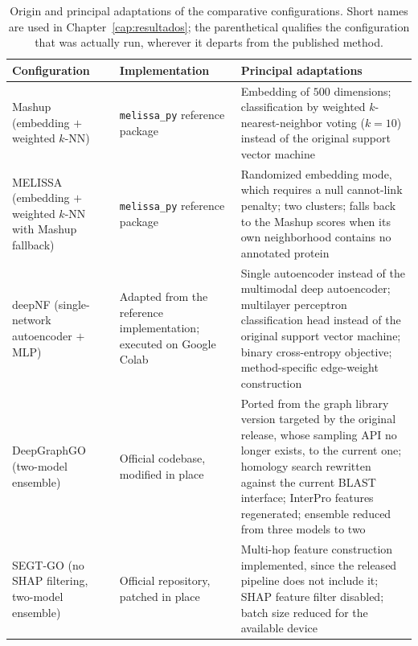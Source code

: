 \documentclass[Ingles]{ic-tese-v3}
\begin{document}
\begin{appendices}{}
\begin{table}[!htb]
  \centering
  \small
  \caption{Origin and principal adaptations of the comparative configurations. Short names are used
  in Chapter~\ref{cap:resultados}; the parenthetical qualifies the configuration that was actually
  run, wherever it departs from the published method.}
  \label{tab:ape_baselines}
  \begin{tabular}{p{3.4cm}p{3.0cm}p{7.0cm}}
    \hline
    \textbf{Configuration} & \textbf{Implementation} & \textbf{Principal adaptations} \\
    \hline
    Mashup \newline (embedding $+$ weighted $k$-NN) &
      \texttt{melissa\_py} reference package &
      Embedding of $500$ dimensions; classification by weighted $k$-nearest-neighbor voting
      ($k = 10$) instead of the original support vector machine \\[2pt]
    MELISSA \newline (embedding $+$ weighted $k$-NN with Mashup fallback) &
      \texttt{melissa\_py} reference package &
      Randomized embedding mode, which requires a null cannot-link penalty; two clusters; falls back
      to the Mashup scores when its own neighborhood contains no annotated protein \\[2pt]
    deepNF \newline (single-network autoencoder $+$ MLP) &
      Adapted from the reference implementation; executed on Google Colab &
      Single autoencoder instead of the multimodal deep autoencoder; multilayer perceptron
      classification head instead of the original support vector machine; binary cross-entropy
      objective; method-specific edge-weight construction \\[2pt]
    DeepGraphGO \newline (two-model ensemble) &
      Official codebase, modified in place &
      Ported from the graph library version targeted by the original release, whose sampling API no
      longer exists, to the current one; homology search rewritten against the current BLAST
      interface; InterPro features regenerated; ensemble reduced from three models to two \\[2pt]
    SEGT-GO \newline (no SHAP filtering, two-model ensemble) &
      Official repository, patched in place &
      Multi-hop feature construction implemented, since the released pipeline does not include it;
      SHAP feature filter disabled; batch size reduced for the available device \\
    \hline
  \end{tabular}
\end{table}


\end{appendices}
\end{document}
